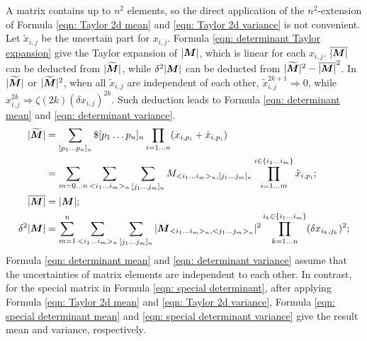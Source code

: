 \documentclass[twoside]{article}
\numberwithin{equation}{section}
\begin{document}
A matrix contains up to $n^2$ elements, so the direct application of the $n^2$-extension of Formula \eqref{eqn: Taylor 2d mean} and \eqref{eqn: Taylor 2d variance} is not convenient.
Let $\tilde{x}_{i,j}$ be the uncertain part for $x_{i,j}$.
Formula \eqref{eqn: determinant Taylor expansion} give the Taylor expansion of $|\protect{\textrm{\boldmath $M$}}|$, which is linear for each $x_{i,j}$.
$\overline{|\protect{\textrm{\boldmath $M$}}|}$ can be deducted from $|\widetilde{\protect{\textrm{\boldmath $M$}}}|$, while $\delta^2 |\protect{\textrm{\boldmath $M$}}|$ can be deducted from $|\widetilde{\protect{\textrm{\boldmath $M$}}}|^2 - \overline{|\protect{\textrm{\boldmath $M$}}|}^2$.
In $|\widetilde{\protect{\textrm{\boldmath $M$}}}|$ or $|\widetilde{\protect{\textrm{\boldmath $M$}}}|^2$, when all $\tilde{x}_{i,j}$ are independent of each other, $\tilde{x}_{i,j}^{2k+1} \Rightarrow 0$, while $x_{i,j}^{2k} \Rightarrow \zeta(2k) (\delta x_{i,j})^{2k}$.
Such deduction leads to Formula \eqref{eqn: determinant mean} and \eqref{eqn: determinant variance}.
\begin{align}
\label{eqn: determinant Taylor expansion}
|\widetilde{\protect{\textrm{\boldmath $M$}}}| &= \sum_{[p_1\dots p_n]_n} \$ [p_1\dots p_n]_n  \prod_{i=1 \dots n} (x_{i,p_i} + \tilde{x}_{i,p_{i}}) \\
	&= \sum_{m=0 \dots n} \sum_{<i_1 \dots i_m>_n} \sum_{[j_1 \dots j_{m}]_n} 
		M_{<i_1 \dots i_m>_n, [j_1 \dots j_{m}]_n} \prod_{i=1 \dots m}^{i \in \{i_1 \dots i_m\}} \tilde{x}_{i,p_{i}}; \nonumber \\
\label{eqn: determinant mean}
\overline{|\protect{\textrm{\boldmath $M$}}|} &= |\protect{\textrm{\boldmath $M$}}|; \\
\label{eqn: determinant variance}
\delta^2 |\protect{\textrm{\boldmath $M$}}| &= \sum_{m=1}^{n} \sum_{<i_1 \dots i_m>_n} \sum_{[j_1 \dots j_m]_n}
  	|\protect{\textrm{\boldmath $M$}} _{<i_1 \dots i_m>_n, <j_1 \dots j_m>_n}|^2 \prod _{k=1 \dots n}^{i_k \in \{i_1 \dots i_m\}} (\delta x_{i_k, j_k})^2; 
\end{align}
Formula \eqref{eqn: determinant mean} and \eqref{eqn: determinant variance} assume that the uncertainties of matrix elements are independent to each other.
In contrast, for the special matrix in Formula \eqref{eqn: special determinant}, after applying Formula \eqref{eqn: Taylor 2d mean} and \eqref{eqn: Taylor 2d variance}, Formula \eqref{eqn: special determinant mean} and \eqref{eqn: special determinant variance} give the result mean and variance, respectively. 
\end{document}

